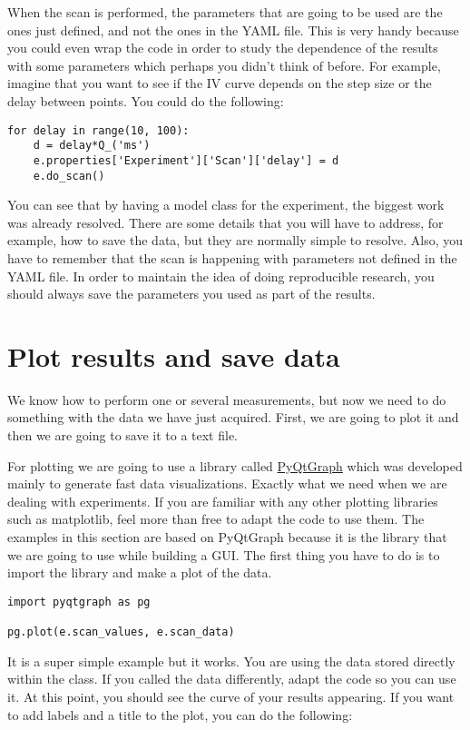 When the scan is performed, the parameters that are going to be used are the ones just defined, and not the ones in the {YAML} file. This is very handy because you could even wrap the code in order to study the dependence of the results with some parameters which perhaps you didn't think of before. For example, imagine that you want to see if the {IV} curve depends on the step size or the delay between points. You could do the following:

\begin{verbatim}
for delay in range(10, 100):
    d = delay*Q_('ms')
    e.properties['Experiment']['Scan']['delay'] = d
    e.do_scan()
\end{verbatim}

You can see that by having a model class for the experiment, the biggest work was already resolved. There are some details that you will have to address, for example, how to save the data, but they are normally simple to resolve. Also, you have to remember that the scan is happening with parameters not defined in the {YAML} file. In order to maintain the idea of doing reproducible research, you should always save the parameters you used as part of the results.

\section{Plot results and save data}\label{plot-results-and-savedata}
We know how to perform one or several measurements, but now we need to do something with the data we have just acquired. First, we are going to plot it and then we are going to save it to a text file.

For plotting we are going to use a library called \href{http://www.pyqtgraph.org/}{PyQtGraph} which was developed mainly to generate fast data visualizations. Exactly what we need when we are dealing with experiments. If you are familiar with any other plotting libraries such as matplotlib, feel more than free to adapt the code to use them. The examples in this section are based on PyQtGraph because it is the library that we are going to use while building a {GUI}. The first thing you have to do is to import the library and make a plot of the data.

\begin{verbatim}
import pyqtgraph as pg

pg.plot(e.scan_values, e.scan_data)
\end{verbatim}

It is a super simple example but it works. You are using the data stored directly within the class. If you called the data differently, adapt the code so you can use it. At this point, you should see the curve of your results appearing. If you want to add labels and a title to the plot, you can do the following:

